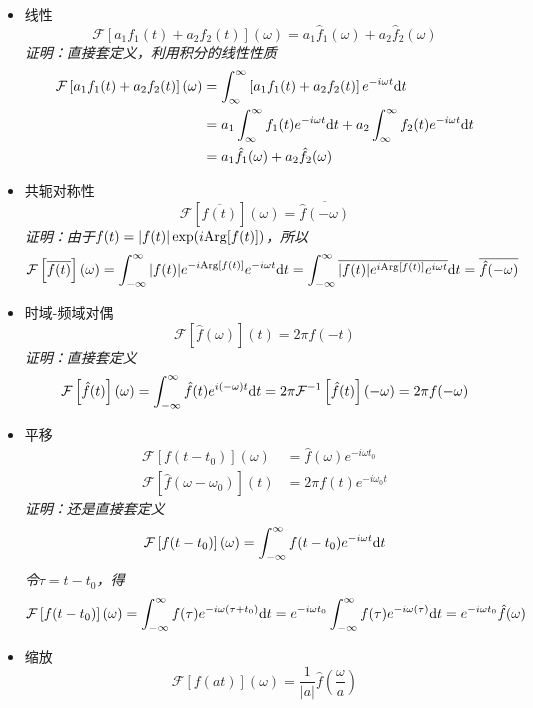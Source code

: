 \begin{itemize}
    \item [(1)] 线性
    \[ \mathcal{F}\left[a_1f_1(t)+a_2f_2(t)\right](\omega) = a_1\hat{f}_1(\omega)+a_2\hat{f}_2(\omega)\]
    \textit{
        证明：直接套定义，利用积分的线性性质
    }
    \begin{align*} 
        \mathcal{F}\left[a_1f_1(t)+a_2f_2(t)\right](\omega) &= \int_{\infty}^{\infty}\left[a_1f_1(t)+a_2f_2(t)\right]e^{-i\omega t}{\rm d}t \\
        &= a_1\int_{\infty}^{\infty}f_1(t)e^{-i\omega t}{\rm d}t + a_2\int_{\infty}^{\infty}f_2(t)e^{-i\omega t}{\rm d}t \\
        &= a_1\hat{f}_1(\omega)+a_2\hat{f}_2(\omega)
    \end{align*}
    \item [(2)] 共轭对称性
    \[ \mathcal{F}\left[\overline{f(t)}\right](\omega) = \overline{\hat{f}(-\omega)}\]
    \textit{
        证明：由于\(f(t)=|f(t)|\exp(i{\rm Arg}[f(t)])\)，所以
    }
    \[\mathcal{F}\left[\overline{f(t)}\right](\omega) = \int_{-\infty}^{\infty}|f(t)|e^{-i{\rm Arg}[f(t)]}e^{-i\omega t}{\rm d}t = \int_{-\infty}^{\infty}\overline{|f(t)|e^{i{\rm Arg}[f(t)]}e^{i\omega t}}{\rm d}t = \overline{\hat{f}(-\omega)}\]
    \item [(3)] 时域-频域对偶
    \[ \mathcal{F}\left[\hat{f}(\omega)\right](t) = 2\pi f(-t)\]
    \textit{
        证明：直接套定义
    }
    \[\mathcal{F}\left[\hat{f}(t)\right](\omega) = \int_{-\infty}^{\infty}\hat{f}(t)e^{i(-\omega)t}{\rm d}t = 2\pi\mathcal{F}^{-1}\left[\hat{f}(t)\right](-\omega) = 2\pi f(-\omega)\]
    \item [(4)] 平移
    \begin{align*} 
        \mathcal{F}\left[f(t-t_0)\right](\omega) &= \hat{f}(\omega)e^{-i\omega t_0} \\
        \mathcal{F}\left[\hat{f}(\omega-\omega_0)\right](t) &= 2\pi f(t)e^{-i\omega_0t}
    \end{align*}
    \textit{
        证明：还是直接套定义
    }
    \[ \mathcal{F}\left[f(t-t_0)\right](\omega) = \int_{-\infty}^{\infty} f(t-t_0)e^{-i\omega t}{\rm d}t\]
    \textit{令\(\tau = t-t_0\)，得}
    \[ \mathcal{F}\left[f(t-t_0)\right](\omega) = \int_{-\infty}^{\infty} f(\tau)e^{-i\omega(\tau+t_0)}{\rm d}t = e^{-i\omega t_0}\int_{-\infty}^{\infty} f(\tau)e^{-i\omega(\tau)}{\rm d}t = e^{-i\omega t_0}\hat{f}(\omega) \]
    \item [(5)] 缩放
    \[ \mathcal{F}\left[f(at)\right](\omega) = \frac{1}{|a|}\hat{f}\left(\frac{\omega}{a}\right) \]

\end{itemize}
